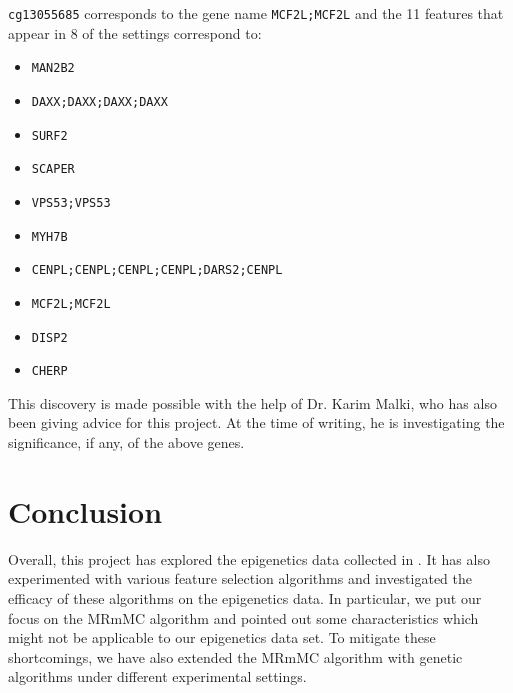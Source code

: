 \documentclass[12pt, twoside, a4paper]{report}
\begin{document}
\texttt{cg13055685} corresponds to the gene name \texttt{MCF2L;MCF2L} and the 11 features that appear in 8 of the settings correspond to:
\begin{itemize}
  \item \texttt{MAN2B2}
  \item \texttt{DAXX;DAXX;DAXX;DAXX}
  \item \texttt{SURF2}
  \item \texttt{SCAPER}
  \item \texttt{VPS53;VPS53}
  \item \texttt{MYH7B}
  \item \texttt{CENPL;CENPL;CENPL;CENPL;DARS2;CENPL}
  \item \texttt{MCF2L;MCF2L}
  \item \texttt{DISP2}
  \item \texttt{CHERP}
\end{itemize}

This discovery is made possible with the help of Dr. Karim Malki, who has also been giving advice for this project. At the time of writing, he is investigating the significance, if any, of the above genes.


\chapter{Conclusion}

Overall, this project has explored the epigenetics data collected in \cite{RefWorks:78}. It has also experimented with various feature selection algorithms and investigated the efficacy of these algorithms on the epigenetics data. In particular, we put our focus on the MRmMC algorithm and pointed out some characteristics which might not be applicable to our epigenetics data set. To mitigate these shortcomings, we have also extended the MRmMC algorithm with genetic algorithms under different experimental settings.
\end{document}
